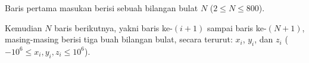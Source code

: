 Baris pertama masukan berisi sebuah bilangan bulat $N$ ($2\le{N}\le{800}$).

Kemudian $N$ baris berikutnya, yakni baris ke-$(i+1)$ sampai baris ke-$(N+1)$, masing-masing berisi tiga buah bilangan bulat, secara terurut: $x_i$, $y_i$, dan $z_i$ ($-10^6\le{x_i,y_i,z_i}\le{10^6}$).